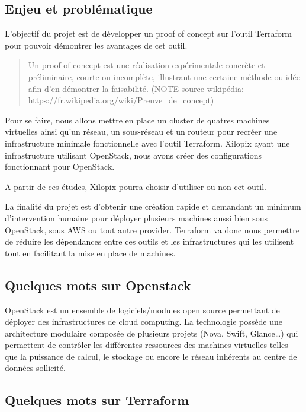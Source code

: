 \documentclass[]{article}
\begin{document}
\subsection{Enjeu et problématique}\label{enjeu-et-probluxe9matique}

L'objectif du projet est de développer un proof of concept sur l'outil
Terraform pour pouvoir démontrer les avantages de cet outil.

\begin{quote}
Un proof of concept est une réalisation expérimentale concrète et
préliminaire, courte ou incomplète, illustrant une certaine méthode ou
idée afin d'en démontrer la faisabilité. (NOTE source wikipédia:
https://fr.wikipedia.org/wiki/Preuve\_de\_concept)
\end{quote}

Pour se faire, nous allons mettre en place un cluster de quatres
machines virtuelles ainsi qu'un réseau, un sous-réseau et un routeur
pour recréer une infrastructure minimale fonctionnelle avec l'outil
Terraform. Xilopix ayant une infrastructure utilisant OpenStack, nous
avons créer des configurations fonctionnant pour OpenStack.

A partir de ces études, Xilopix pourra choisir d'utiliser ou non cet
outil.

La finalité du projet est d'obtenir une création rapide et demandant un
minimum d'intervention humaine pour déployer plusieurs machines aussi
bien sous OpenStack, sous AWS ou tout autre provider. Terraform va donc
nous permettre de réduire les dépendances entre ces outils et les
infrastructures qui les utilisent tout en facilitant la mise en place de
machines.

\subsection{Quelques mots sur
Openstack}\label{quelques-mots-sur-openstack}

OpenStack est un ensemble de logiciels/modules open source permettant de
déployer des infrastructures de cloud computing. La technologie possède
une architecture modulaire composée de plusieurs projets (Nova, Swift,
Glance\ldots{}) qui permettent de contrôler les différentes ressources
des machines virtuelles telles que la puissance de calcul, le stockage
ou encore le réseau inhérents au centre de données sollicité.

\subsection{Quelques mots sur
Terraform}\label{quelques-mots-sur-terraform}
\end{document}
